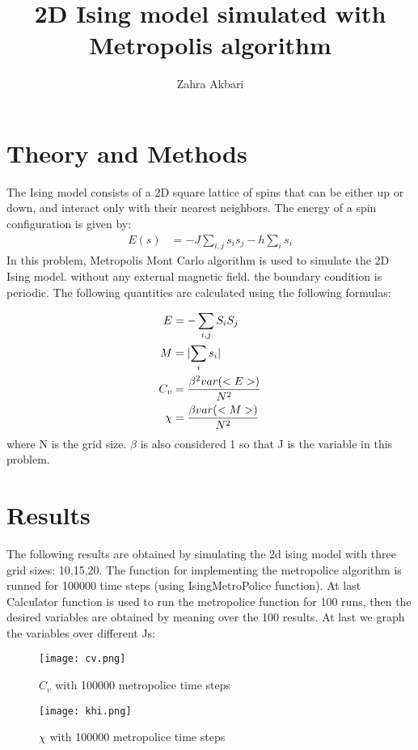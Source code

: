 \documentclass[12pt,a4paper]{article}
\title{2D Ising model simulated with Metropolis algorithm}
\author{Zahra Akbari}
\date{}
\begin{document}
	\maketitle
	\section*{Theory and Methods}
	The Ising model
	consists of a 2D square lattice of spins that can be either up or down, and interact only with their nearest neighbors. The energy of a spin configuration is given by:
	\begin{align*}
	E(s) &= -J \sum_{i,j} s_i s_j - h \sum_{i} s_i	
	\end{align*}
	In this problem, Metropolis Mont Carlo algorithm is used to simulate the 2D Ising model. without any external magnetic field.
 the boundary condition is periodic.
The following quantities are calculated using the following formulas:

\begin{align*}
	E &= -\sum_{i,j} S_{i} S_j\\
	M &= \abs*{\sum_i s_i}\\
	C_v &= \frac{\beta^2 var(<E>)}{N^2}\\
	\chi &= \frac{\beta var(<M>)}{N^2}\\
\end{align*}
	where N is the grid size. $\beta$ is also considered 1 so that J is the variable in this problem.

	\pagebreak

	\section*{Results}
	The following results are obtained by simulating the 2d ising model with three grid sizes: 10,15,20.
	The function for implementing the metropolice algorithm is runned for 100000 time steps (using IsingMetroPolice function). At last Calculator function 
	is used to run the metropolice function for 100 runs, then the desired variables are obtained by meaning over the 100 results.
	At last we graph the variables over different Js:

			
			\begin{figure}[H]
				\centering
				\texttt{[image: cv.png]}
				\caption{$C_v$ with 100000 metropolice time steps }
			\end{figure}

			\begin{figure}[H]
				\centering
				\texttt{[image: khi.png]}
				\caption{$\chi$ with 100000 metropolice time steps}
			\end{figure}
\end{document}
